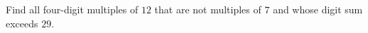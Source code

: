 Find all four-digit multiples of $12$ that are not multiples of $7$ and whose digit sum exceeds $29$.
